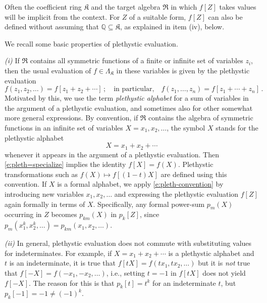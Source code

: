 \documentclass[12pt]{amsart}
\theoremstyle{definition}
\theoremstyle{remark}
\newcommand{\QQ}{{\mathbb Q}}
\newcommand{\Kfrak}{{\mathfrak K}}
\newcommand{\Rfrak}{{\mathfrak R}}
\begin{document}
Often the coefficient ring $\Kfrak $ and the target algebra $\Rfrak $
in which $f[Z]$ takes values will be implicit from the context.  For
$Z$ of a suitable form, $f[Z]$ can also be defined without assuming
that $\QQ \subseteq \Kfrak $, as explained in item (iv), below.

We recall some basic properties of plethystic evaluation.

{\it (i) } If $\Rfrak $ contains all symmetric functions of a finite
or infinite set of variables $z_{i}$, then the usual evaluation of
$f\in \Lambda _{\Kfrak }$ in these variables is given by the
plethystic evaluation
\begin{equation}\label{e:pleth=specialize}
f(z_{1},z_{2},\ldots ) = f[z_{1}+z_{2} + \cdots]\, ; \quad \text{in
particular,}\quad f(z_{1},\ldots,z_{n}) = f[z_{1}+\cdots +z_{n}]\, .
\end{equation}
Motivated by this, we use the term {\em plethystic alphabet} for a sum
of variables in the argument of a plethystic evaluation, and
sometimes also for other somewhat more general expressions.  By
convention, if $\Rfrak $ contains the algebra of symmetric functions
in an infinite set of variables $X = x_{1},x_{2},\ldots $, the symbol
$X$ stands for the
plethystic alphabet
\begin{equation}\label{e:pleth-convention}
X = x_{1}+x_{2}+\cdots
\end{equation}
whenever it appears in the argument of a plethystic evaluation.  Then
\eqref{e:pleth=specialize} implies the identity $f[X] = f(X)$.
Plethystic transformations such as $f(X)\mapsto f[(1-t)X]$ are defined
using this convention.  If $X$ is a formal alphabet, we apply
\eqref{e:pleth-convention} by introducing new variables $x_{1},
x_{2},\ldots $ and expressing the plethystic evaluation $f[Z]$ again
formally in terms of $X$.  Specifically, any formal power-sum
$p_{m}(X)$ occurring in $Z$ becomes $p_{km}(X)$ in $p_{k}[Z]$, since
$p_{m}(x_{1}^{k}, x_{2}^{k} ,\ldots ) = p_{km}(x_{1}, x_{2}, \ldots
)$.


{\it (ii) } In general, plethystic evaluation does not commute with
substituting values for indeterminates.  For example, if $X =
x_{1}+x_{2}+\cdots $ is a plethystic alphabet and $t$ is an
indeterminate, it is true that $f[t X] = f(t x_{1}, t x_{2}, \ldots )$
but it is {\em not} true that $f[-X] = f(-x_{1}, -x_{2}, \ldots )$,
i.e., setting $t = -1$ in $f[t X]$ does not yield $f[-X]$.  The reason
for this is that $p_{k}[t] = t^{k}$ for an indeterminate $t$, but
$p_{k}[-1] = -1 \not =(-1)^{k}$.
\end{document}
